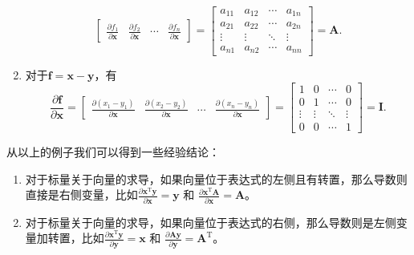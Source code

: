 \begin{solution}
\begin{enumerate}
\[\begin{bmatrix}
                      \frac{\partial f_1}{\partial \bm{x}} & \frac{\partial f_2}{\partial \bm{x}} & \cdots & \frac{\partial f_n}{\partial \bm{x}}
                  \end{bmatrix} = \begin{bmatrix}
                      a_{11} & a_{12} & \cdots & a_{1n} \\
                      a_{21} & a_{22} & \cdots & a_{2n} \\
                      \vdots & \vdots & \ddots & \vdots \\
                      a_{n1} & a_{n2} & \cdots & a_{nn}
                  \end{bmatrix} = \mathbf{A}.
              \]
        \item 对于\( \bm{f} = \bm{x} - \bm{y} \)，有
              \[
                  \frac{\partial \bm{f}}{\partial \bm{x}} = \begin{bmatrix}
                      \frac{\partial (x_1 - y_1)}{\partial \bm{x}} & \frac{\partial (x_2 - y_2)}{\partial \bm{x}} & \cdots & \frac{\partial (x_n - y_n)}{\partial \bm{x}}
                  \end{bmatrix} = \begin{bmatrix}
                      1      & 0      & \cdots & 0      \\
                      0      & 1      & \cdots & 0      \\
                      \vdots & \vdots & \ddots & \vdots \\
                      0      & 0      & \cdots & 1
                  \end{bmatrix} = \mathbf{I}.
              \]
    \end{enumerate}
\end{solution}

从以上的例子我们可以得到一些经验结论：

\begin{enumerate}
    \item 对于标量关于向量的求导，如果向量位于表达式的左侧且有转置，那么导数则直接是右侧变量，比如\( \frac{\partial \bm{x}^{\mathrm{T}} \bm{y}}{\partial \bm{x}} = \bm{y}\) 和 \( \frac{\partial \bm{x}^{\mathrm{T}} \mathbf{A}}{\partial \bm{x}} = \mathbf{A} \)。
    \item 对于标量关于向量的求导，如果向量位于表达式的右侧，那么导数则是左侧变量加转置，比如\( \frac{\partial \bm{x}^{\mathrm{T}} \bm{y}}{\partial \bm{y}} = \bm{x}\) 和 \( \frac{\partial \mathbf{A} \bm{y}}{\partial \bm{y}} = \mathbf{A}^{\mathrm{T}} \)。
\end{enumerate}


